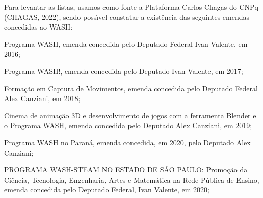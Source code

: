 \documentclass[
12pt,		%
openright,	%
twoside,  %
a4paper,			%
chapter=TITLE,		%
english,			%
french,				%
spanish,			%
brazil				%
]{USPSC-classe/USPSC}
\begin{document}
Para levantar as listas, usamos como fonte a Plataforma Carlos Chagas do CNPq (CHAGAS, 2022), sendo poss\'{\i}vel constatar a exist\^encia das seguintes emendas concedidas ao WASH:


















\begin{alineas}
\item \textquotedbl Programa WASH, emenda concedida pelo Deputado Federal Ivan Valente, em 2016;
\item \textquotedbl Programa WASH!\textquotedbl , emenda concedida pelo Deputado Ivan Valente, em 2017;
\item \textquotedbl Forma\c{c}\~ao em Captura de Movimentos\textquotedbl , emenda concedida pelo Deputado Federal Alex Canziani, em 2018;
\item \textquotedbl Cinema de anima\c{c}\~ao 3D e desenvolvimento de jogos com a ferramenta Blender e o Programa WASH\textquotedbl , emenda concedida pelo Deputado Alex Canziani, em 2019;
\item \textquotedbl Programa WASH no Paran\'a\textquotedbl , emenda concedida, em 2020, pelo Deputado Alex Canziani;
\item \textquotedbl PROGRAMA WASH-STEAM NO ESTADO DE S\~AO PAULO: Promo\c{c}\~ao da Ci\^encia, 
Tecnologia, Engenharia, Artes  e Matem\'atica na Rede P\'ublica de Ensino\textquotedbl , emenda concedida pelo Deputado Federal, Ivan Valente, em 2020;


\end{alineas}
\end{document}
